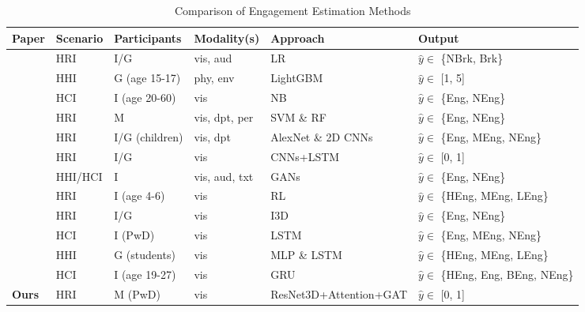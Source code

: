 \documentclass[VANCOUVER,STIX1COL]{WileyNJD-v2}
\begin{document}
\begin{table}[htb!]
  \centering
  \caption{Comparison of Engagement Estimation Methods}
  \label{t:references}
  \begin{threeparttable}[b]
  \begin{tabular}{llllll}
  \toprule
  \textbf{Paper} & \textbf{Scenario} & \textbf{Participants}\tnote{1} & \textbf{Modality(s)}\tnote{2} & \textbf{Approach} \tnote{3} & \textbf{Output}\tnote{4} \\
  \midrule
  \cite{BenYoussef2019Early} & HRI & I/G & vis, aud & LR & $\hat{y} \in$ \{NBrk, Brk\} \\
  \cite{Gao2020NGage} & HHI & G (age 15-17) & phy, env & LightGBM & $\hat{y} \in$ [1, 5] \\
  \cite{Monkaresi2017Automated} & HCI & I (age 20-60) & vis & NB & $\hat{y} \in$ \{Eng, NEng\} \\
  \cite{Salam2017Fully} & HRI & M & vis, dpt, per & SVM \& RF & $\hat{y} \in$ \{Eng, NEng\} \\
  \midrule
  \cite{Anagnostopoulou2021Engagement} & HRI & I/G (children) & vis, dpt & AlexNet \& 2D CNNs & $\hat{y} \in$ \{Eng, MEng, NEng\} \\
  \cite{DelDuchetto2020Are} & HRI & I/G & vis & CNNs+LSTM & $\hat{y} \in$ [0, 1] \\
  \cite{Guhan2020ABCNet} & HHI/HCI & I & vis, aud, txt & GANs & $\hat{y} \in$ \{Eng, NEng\} \\
  \cite{Rudovic2019Personalized} & HRI & I (age 4-6) & vis & RL & $\hat{y} \in$ \{HEng, MEng, LEng\} \\
  \cite{Saleh2021Improving} & HRI & I/G & vis & I3D & $\hat{y} \in$ \{Eng, NEng\} \\
  \cite{Steinert2020Engagement} & HCI & I (PwD) & vis & LSTM & $\hat{y} \in$ \{Eng, MEng, NEng\} \\
  \cite{Sumer2021Multimodal} & HHI & G (students) & vis & MLP \& LSTM & $\hat{y} \in$ \{HEng, MEng, LEng\} \\
  \cite{Zhu2020Multirate} & HCI &
  I (age 19-27) & vis & GRU & $\hat{y} \in$ \{HEng, Eng, BEng, NEng\} \\
  \midrule
  \textbf{Ours} & HRI & M (PwD) & vis & ResNet3D+Attention+GAT & $\hat{y} \in$ [0, 1] \\
  \bottomrule
  \end{tabular}
  \begin{tablenotes}

\end{tablenotes}
\end{threeparttable}
\end{table}
\end{document}
